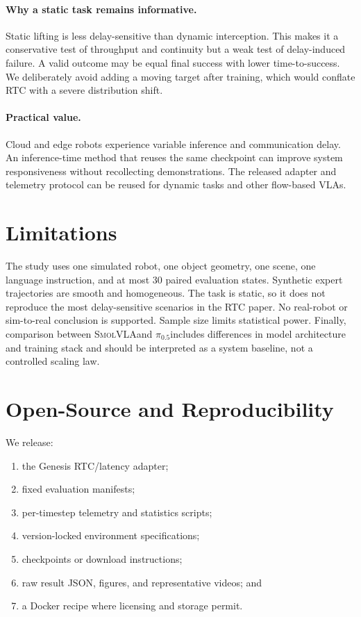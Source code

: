 \documentclass[10pt,twocolumn]{article}
\newcommand{\pifive}{$\pi_{0.5}$}
\newcommand{\smolvla}{\textsc{SmolVLA}}
\begin{document}
\paragraph{Why a static task remains informative.}
Static lifting is less delay-sensitive than dynamic interception.  This makes
it a conservative test of throughput and continuity but a weak test of
delay-induced failure.  A valid outcome may be equal final success with lower
time-to-success.  We deliberately avoid adding a moving target after training,
which would conflate RTC with a severe distribution shift.

\paragraph{Practical value.}
Cloud and edge robots experience variable inference and communication delay.
An inference-time method that reuses the same checkpoint can improve system
responsiveness without recollecting demonstrations.  The released adapter and
telemetry protocol can be reused for dynamic tasks and other flow-based VLAs.

\section{Limitations}

The study uses one simulated robot, one object geometry, one scene, one
language instruction, and at most 30 paired evaluation states.  Synthetic
expert trajectories are smooth and homogeneous.  The task is static, so it
does not reproduce the most delay-sensitive scenarios in the RTC paper.
No real-robot or sim-to-real conclusion is supported.  Sample size limits
statistical power.  Finally, comparison between \smolvla and \pifive includes
differences in model architecture and training stack and should be interpreted
as a system baseline, not a controlled scaling law.

\section{Open-Source and Reproducibility}

We release:

\begin{enumerate}[leftmargin=*,itemsep=1pt]
  \item the Genesis RTC/latency adapter;
  \item fixed evaluation manifests;
  \item per-timestep telemetry and statistics scripts;
  \item version-locked environment specifications;
  \item checkpoints or download instructions;
  \item raw result JSON, figures, and representative videos; and
  \item a Docker recipe where licensing and storage permit.
\end{enumerate}
\end{document}
